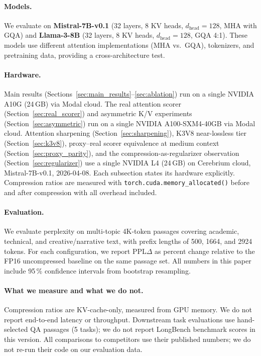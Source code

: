 \documentclass{article}
\begin{document}
\paragraph{Models.}
We evaluate on \textbf{Mistral-7B-v0.1} (32 layers, 8 KV heads,
$d_\text{head}{=}128$, MHA with GQA) and \textbf{Llama-3-8B}
(32 layers, 8 KV heads, $d_\text{head}{=}128$, GQA 4:1). These models
use different attention implementations (MHA vs.\ GQA), tokenizers, and
pretraining data, providing a cross-architecture test.

\paragraph{Hardware.}
Main results (Sections~\ref{sec:main_results}--\ref{sec:ablation}) run on a single
NVIDIA A10G (24\,GB) via Modal cloud. The real attention scorer
(Section~\ref{sec:real_scorer}) and asymmetric K/V experiments
(Section~\ref{sec:asymmetric}) run on a single NVIDIA A100-SXM4-40GB via Modal cloud.
Attention sharpening (Section~\ref{sec:sharpening}), K3V8 near-lossless tier
(Section~\ref{sec:k3v8}), proxy--real scorer equivalence at medium context
(Section~\ref{sec:proxy_parity}), and the compression-as-regularizer observation
(Section~\ref{sec:regularizer}) use a single NVIDIA L4 (24\,GB) on Cerebrium cloud,
Mistral-7B-v0.1, 2026-04-08.
Each subsection states its hardware explicitly.
Compression ratios are measured with \texttt{torch.cuda.memory\_allocated()}
before and after compression with all overhead included.

\paragraph{Evaluation.}
We evaluate perplexity on multi-topic 4K-token passages covering academic,
technical, and creative/narrative text, with prefix lengths of 500, 1664,
and 2924 tokens. For each configuration, we report PPL$\Delta$ as percent
change relative to the FP16 uncompressed baseline on the same passage set.
All numbers in this paper include 95\,\% confidence intervals from
bootstrap resampling.

\paragraph{What we measure and what we do not.}
Compression ratios are KV-cache-only, measured from GPU memory. We do not
report end-to-end latency or throughput. Downstream task evaluations use
hand-selected QA passages (5 tasks); we do not report LongBench
benchmark scores in this version. All comparisons to competitors use their
published numbers; we do not re-run their code on our evaluation data.
\end{document}
